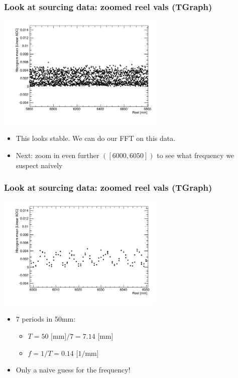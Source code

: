 \documentclass[bigger]{beamer}
\begin{document}
\begin{frame}
\frametitle{Look at sourcing data: zoomed reel vals (TGraph)}
\label{sec-3-1-3}
\label{sec-3-1-3-1}

\centering
\includegraphics[width=0.6\textwidth]{fig/sourcing_zoomed_plot.png}
\begin{itemize}

\item This looks stable.  We can do our FFT on this data.
\label{sec-3-1-3-2}%

\item Next: zoom in even further \(([6000,6050])\) to see what frequency we suspect naively
\label{sec-3-1-3-3}%
\end{itemize} %
\end{frame}
\begin{frame}
\frametitle{Look at sourcing data: zoomed reel vals (TGraph)}
\label{sec-3-1-4}
\label{sec-3-1-4-1}

\centering
\includegraphics[width=0.6\textwidth]{fig/sourcing_very_zoomed_plot.png}
\begin{itemize}

\item 7 periods in 50mm:
\label{sec-3-1-4-2}%
\begin{itemize}

\item \(T = 50 \text{ [mm]}/ 7 = 7.14 \text{ [mm]} \)
\label{sec-3-1-4-2-1}%

\item \(f = 1/T = 0.14 \text{ [1/mm]}\)
\label{sec-3-1-4-2-2}%
\end{itemize} %

\item Only a naive guess for the frequency!
\label{sec-3-1-4-3}%
\end{itemize} %
\end{frame}
\end{document}
